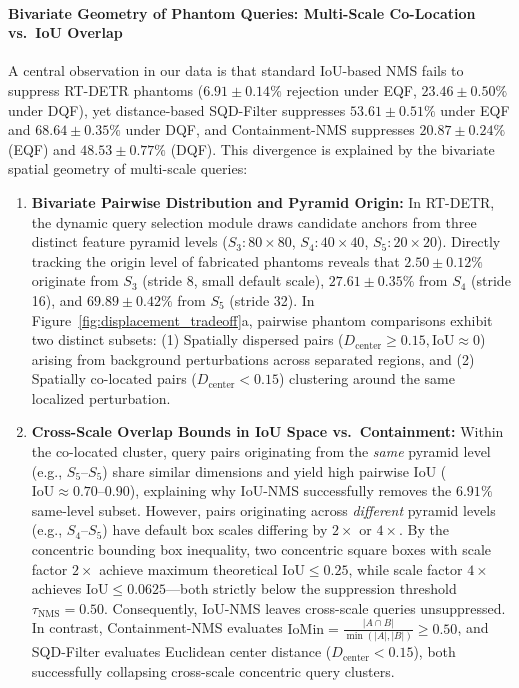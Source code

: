 \documentclass[preprint,12pt]{elsarticle}
\begin{document}
\paragraph{Bivariate Geometry of Phantom Queries: Multi-Scale Co-Location vs.\ IoU Overlap}
A central observation in our data is that standard IoU-based NMS fails to suppress RT-DETR phantoms ($6.91 \pm 0.14\%$ rejection under EQF, $23.46 \pm 0.50\%$ under DQF), yet distance-based SQD-Filter suppresses $53.61 \pm 0.51\%$ under EQF and $68.64 \pm 0.35\%$ under DQF, and Containment-NMS suppresses $20.87 \pm 0.24\%$ (EQF) and $48.53 \pm 0.77\%$ (DQF). This divergence is explained by the bivariate spatial geometry of multi-scale queries:
\begin{enumerate}
    \item \textbf{Bivariate Pairwise Distribution and Pyramid Origin:} In RT-DETR, the dynamic query selection module draws candidate anchors from three distinct feature pyramid levels ($S_3: 80\times 80$, $S_4: 40\times 40$, $S_5: 20\times 20$). Directly tracking the origin level of fabricated phantoms reveals that $2.50 \pm 0.12\%$ originate from $S_3$ (stride 8, small default scale), $27.61 \pm 0.35\%$ from $S_4$ (stride 16), and $69.89 \pm 0.42\%$ from $S_5$ (stride 32). In Figure~\ref{fig:displacement_tradeoff}a, pairwise phantom comparisons exhibit two distinct subsets: (1) Spatially dispersed pairs ($D_{\mathrm{center}} \ge 0.15, \mathrm{IoU} \approx 0$) arising from background perturbations across separated regions, and (2) Spatially co-located pairs ($D_{\mathrm{center}} < 0.15$) clustering around the same localized perturbation.
    \item \textbf{Cross-Scale Overlap Bounds in IoU Space vs.\ Containment:} Within the co-located cluster, query pairs originating from the \textit{same} pyramid level (e.g., $S_5\text{--}S_5$) share similar dimensions and yield high pairwise IoU ($\mathrm{IoU} \approx 0.70\text{--}0.90$), explaining why IoU-NMS successfully removes the $6.91\%$ same-level subset. However, pairs originating across \textit{different} pyramid levels (e.g., $S_4\text{--}S_5$) have default box scales differing by $2\times$ or $4\times$. By the concentric bounding box inequality, two concentric square boxes with scale factor $2\times$ achieve maximum theoretical $\mathrm{IoU} \le 0.25$, while scale factor $4\times$ achieves $\mathrm{IoU} \le 0.0625$---both strictly below the suppression threshold $\tau_{\mathrm{NMS}} = 0.50$. Consequently, IoU-NMS leaves cross-scale queries unsuppressed. In contrast, Containment-NMS evaluates $\mathrm{IoMin} = \frac{|A \cap B|}{\min(|A|, |B|)} \ge 0.50$, and SQD-Filter evaluates Euclidean center distance ($D_{\mathrm{center}} < 0.15$), both successfully collapsing cross-scale concentric query clusters.
\end{enumerate}
\end{document}
